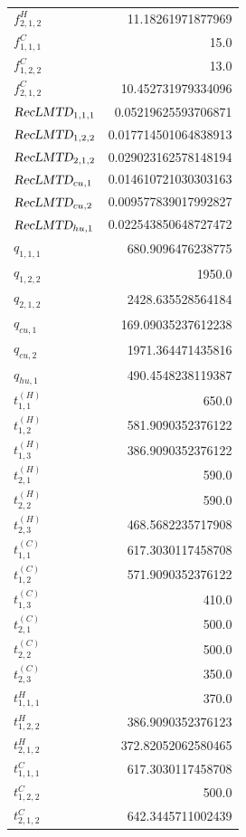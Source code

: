 \documentclass{article}%
\begin{document}
\begin{multicols*}{3}
\begin{supertabular}{lr}
	$f_{2,1,2}^{H}$ & 11.18261971877969 \\%
	$f_{1,1,1}^{C}$ & 15.0 \\%
	$f_{1,2,2}^{C}$ & 13.0 \\%
	$f_{2,1,2}^{C}$ & 10.452731979334096 \\%
	$\textsl{RecLMTD}_{1,1,1}$ & 0.05219625593706871 \\%
	$\textsl{RecLMTD}_{1,2,2}$ & 0.017714501064838913 \\%
	$\textsl{RecLMTD}_{2,1,2}$ & 0.029023162578148194 \\%
	$\textsl{RecLMTD}_{cu,1}$ & 0.014610721030303163 \\%
	$\textsl{RecLMTD}_{cu,2}$ & 0.009577839017992827 \\%
	$\textsl{RecLMTD}_{hu,1}$ & 0.022543850648727472 \\%
	$q_{1,1,1}$ & 680.9096476238775 \\%
	$q_{1,2,2}$ & 1950.0 \\%
	$q_{2,1,2}$ & 2428.635528564184 \\%
	$q_{cu,1}$ & 169.09035237612238 \\%
	$q_{cu,2}$ & 1971.364471435816 \\%
	$q_{hu,1}$ & 490.4548238119387 \\%
	$t_{1,1}^{(H)}$ & 650.0 \\%
	$t_{1,2}^{(H)}$ & 581.9090352376122 \\%
	$t_{1,3}^{(H)}$ & 386.9090352376122 \\%
	$t_{2,1}^{(H)}$ & 590.0 \\%
	$t_{2,2}^{(H)}$ & 590.0 \\%
	$t_{2,3}^{(H)}$ & 468.5682235717908 \\%
	$t_{1,1}^{(C)}$ & 617.3030117458708 \\%
	$t_{1,2}^{(C)}$ & 571.9090352376122 \\%
	$t_{1,3}^{(C)}$ & 410.0 \\%
	$t_{2,1}^{(C)}$ & 500.0 \\%
	$t_{2,2}^{(C)}$ & 500.0 \\%
	$t_{2,3}^{(C)}$ & 350.0 \\%
	$t_{1,1,1}^{H}$ & 370.0 \\%
	$t_{1,2,2}^{H}$ & 386.9090352376123 \\%
	$t_{2,1,2}^{H}$ & 372.82052062580465 \\%
	$t_{1,1,1}^{C}$ & 617.3030117458708 \\%
	$t_{1,2,2}^{C}$ & 500.0 \\%
	$t_{2,1,2}^{C}$ & 642.3445711002439 \\%

\end{supertabular}
\end{multicols*}
\end{document}
